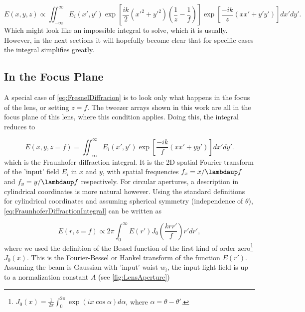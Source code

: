 \begin{equation}\label{eq:FresnelDiffracion}
	E(x,y,z) \propto 
	\iint_{-\infty}^{\infty} E_i(x',y')
	\exp{\left[
		\frac{ik}{2}(x'^2+y'^2)\left(\frac{1}{z}-\frac{1}{f}\right)
	\right]}
	\exp{\left[\frac{-ik}{z}\left(xx'+y'y'\right)\right]} dx'dy'.
\end{equation}
Which might look like an impossible integral to solve, which it is usually.
However, in the next sections it will hopefully become clear that for specific cases the integral simplifies greatly.  

\subsection{In the Focus Plane}\label{sec:InFocus}

A special case of \cref{eq:FresnelDiffracion} is to look only what happens in the focus of the lens, or setting $z=f$.
The tweezer arrays shown in this work are all in the focus plane of this lens, where this condition applies.
Doing this, the integral reduces to 

\begin{equation}\label{eq:FraunhoferDiffractionIntegral}
    E(x, y, z=f)=\iint_{-\infty}^{\infty} E_i(x', y') \exp \left[\frac{-ik}{f}(x x'+y y')\right] dx' dy'.
\end{equation}
which is the Fraunhofer diffraction integral. 
It is the 2D spatial Fourier transform of the 'input' field $E_i$ in $x$ and $y$, with spatial frequencies $f_x = x/\lambdaup f$ and $f_y = y/\lambdaup f$ respectively.
For circular apertures, a description in cylindrical coordinates is more natural however. 
Using the standard definitions for cylindrical coordinates and assuming spherical symmetry (independence of $\theta$), \cref{eq:FraunhoferDiffractionIntegral} can be written as 

\begin{equation}\label{eq:FourierBessel}
	E(r,z=f) \propto 2\pi \int_0^{\infty} E(r') J_0\left( \frac{k r r'}{f}\right) r'dr',
\end{equation}
where we used the definition of the  Bessel function of the first kind of order zero\footnote{$J_0(x) = \frac{1}{2\pi} \int_0^{2\pi} \exp{(i x \cos{\alpha})} d\alpha$, where  $\alpha=\theta-\theta'$.} $J_0(x)$. 
This is the Fourier-Bessel or Hankel transform of the function $E(r')$.
Assuming the beam is Gaussian with 'input' waist $w_i$, the input light field is up to a normalization constant $A$ (see \cref{fig:LensAperture})

